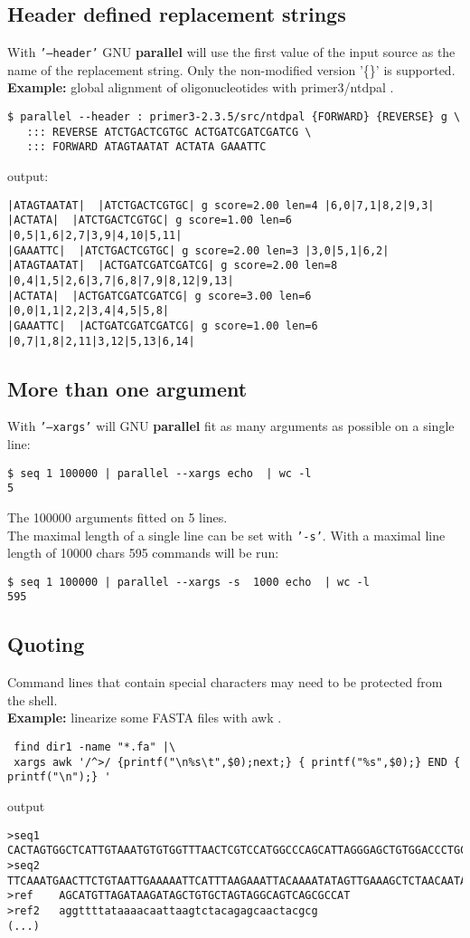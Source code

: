 \documentclass{article}
\newcommand{\example}[1]{
\textbf{Example: } {\color[rgb]{0,0,1} #1 } .
}
\newcommand{\cmdoption}[1]{\texttt{'#1'}}
\def\prl{\textbf{parallel}}
\begin{document}
\subsection{Header defined replacement strings}
With \cmdoption{--header} GNU \prl{} will use the first value of the input source as the name of the replacement string. Only the non-modified version '\{\}' is supported.\\
\example{global alignment of oligonucleotides with primer3/ntdpal}
\begin{lstlisting}
$ parallel --header : primer3-2.3.5/src/ntdpal {FORWARD} {REVERSE} g \
   ::: REVERSE ATCTGACTCGTGC ACTGATCGATCGATCG \
   ::: FORWARD ATAGTAATAT ACTATA GAAATTC
\end{lstlisting}
output:
\begin{lstlisting}
|ATAGTAATAT|  |ATCTGACTCGTGC| g score=2.00 len=4 |6,0|7,1|8,2|9,3|
|ACTATA|  |ATCTGACTCGTGC| g score=1.00 len=6 |0,5|1,6|2,7|3,9|4,10|5,11|
|GAAATTC|  |ATCTGACTCGTGC| g score=2.00 len=3 |3,0|5,1|6,2|
|ATAGTAATAT|  |ACTGATCGATCGATCG| g score=2.00 len=8 |0,4|1,5|2,6|3,7|6,8|7,9|8,12|9,13|
|ACTATA|  |ACTGATCGATCGATCG| g score=3.00 len=6 |0,0|1,1|2,2|3,4|4,5|5,8|
|GAAATTC|  |ACTGATCGATCGATCG| g score=1.00 len=6 |0,7|1,8|2,11|3,12|5,13|6,14|
\end{lstlisting}

\subsection{More than one argument}
With \texttt{'--xargs'} will GNU \prl{} fit as many arguments as possible on a single line:
\begin{lstlisting}
$ seq 1 100000 | parallel --xargs echo  | wc -l
5
\end{lstlisting}
The 100000 arguments fitted on 5 lines.\\

The maximal length of a single line can be set with \texttt{'-s'}. With a maximal line length of 10000 chars 595 commands will be run:
\begin{lstlisting}
$ seq 1 100000 | parallel --xargs -s  1000 echo  | wc -l
595
\end{lstlisting}

\subsection{Quoting}
Command lines that contain special characters may need to be protected from the shell.\\
\example{linearize some FASTA files with awk}
\begin{lstlisting}
 find dir1 -name "*.fa" |\
 xargs awk '/^>/ {printf("\n%s\t",$0);next;} { printf("%s",$0);} END { printf("\n");} '
\end{lstlisting}
output
\begin{lstlisting}
>seq1	CACTAGTGGCTCATTGTAAATGTGTGGTTTAACTCGTCCATGGCCCAGCATTAGGGAGCTGTGGACCCTGCAGCCTGGCTGTGGGGGCCGCAGT
>seq2	TTCAAATGAACTTCTGTAATTGAAAAATTCATTTAAGAAATTACAAAATATAGTTGAAAGCTCTAACAATAGACTAAACCAAGCAGAAGAAAGA
>ref	AGCATGTTAGATAAGATAGCTGTGCTAGTAGGCAGTCAGCGCCAT
>ref2	aggttttataaaacaattaagtctacagagcaactacgcg
(...)
\end{lstlisting}
\end{document}
